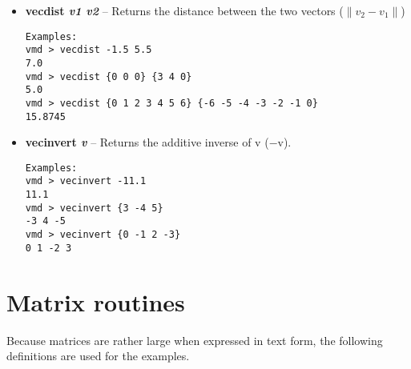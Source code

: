 \begin{itemize}
\item {\bf vecdist {\it v1 v2}} --
Returns the distance between the two vectors ($\|v_2 - v_1 \|$)
\begin{verbatim}
Examples:
vmd > vecdist -1.5 5.5
7.0
vmd > vecdist {0 0 0} {3 4 0}
5.0
vmd > vecdist {0 1 2 3 4 5 6} {-6 -5 -4 -3 -2 -1 0}
15.8745
\end{verbatim}



\item {\bf vecinvert {\it v}} --
Returns the additive inverse of v ($-$v).
\begin{verbatim}
Examples:
vmd > vecinvert -11.1
11.1
vmd > vecinvert {3 -4 5}
-3 4 -5
vmd > vecinvert {0 -1 2 -3}
0 1 -2 3
\end{verbatim}

\end{itemize}

\section{Matrix routines}

  Because matrices are rather large when expressed in text form, the
following definitions are used for the examples.


